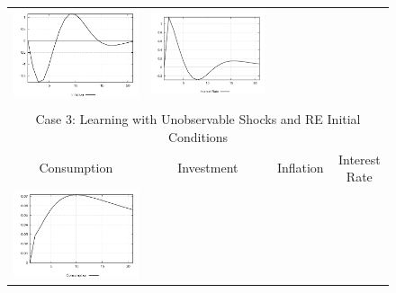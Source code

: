 \begin{figure}
\begin{tabular}{cccc}
\includegraphics[scale=0.22]{results_reallinit/Inflation_mpshock_irf.png} & 
\includegraphics[scale=0.22]{results_reallinit/Interest_Rate_mpshock_irf.png} \\ \\ 
\multicolumn{4}{c}{Case 3: Learning with Unobservable Shocks and RE Initial Conditions}\\
Consumption & Investment & Inflation & Interest Rate \\ 
\includegraphics[scale=0.22]{results_reinit/Consumption_mpshock_irf.png} & 

\end{tabular}
\end{figure}
